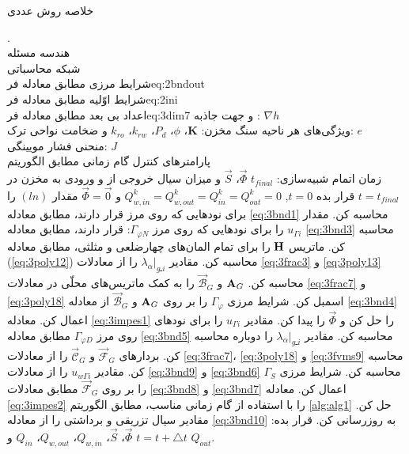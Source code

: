 \begin{algorithm}
	\small    
\caption{خلاصه روش عددی}   
\label{alg:alg2}  
\begin{algorithmic}[1]      
	\REQUIRE .
	\\ هندسه مسئله 
	\\ شبکه محاسباتی 
	\\ شرایط مرزی مطابق معادله ‌فر{eq:2bndout} 
	\\ شرایط اوّلیه مطابق معادله ‌فر{eq:2ini} 
	\\ اعداد بی بعد مطابق معادله ‌فر{eq:3dim7} و جهت جاذبه : $\nabla h$ 
	\\ ویژگی‌های هر ناحیه سنگ مخزن: $\textbf{K}$، $\phi$، $P_d$، $k_{rw}$، $k_{ro}$ و ضخامت نواحی ترک: $e$
	\\ منحنی‌ فشار مویینگی: $J$
	\\ پارامتر‌های کنترل گام زمانی مطابق الگوریتم 
	\\ زمان اتمام شبیه‌سازی: $t_{final}$ 
	\ENSURE $\vec{\Phi}$، $\vec{S}$ و میزان سیال خروجی از و ورودی به مخزن در  $t=t_{final}$
	\STATE قرار بده $t=0$, $Q^k_{w,in}=Q^k_{w,out}=Q^k_{in}=Q^k_{out}=0$ و $\vec{\Phi} = \vec{0}$
	\STATE مقدار  $(ln)$ را برای نودهایی که روی مرز قرار دارند، مطابق معادله \eqref{eq:3bnd1} محاسبه کن.
	\STATE مقدار $u_{\Gamma i}$ را برای نود‌هایی که روی مرز $\Gamma_{\varphi N}$: قرار دارند، مطابق معادله \eqref{eq:3bnd3} محاسبه کن.
	\STATE ماتریس $\textbf H$ را برای تمام المان‌های چهارضلعی و مثلثی، مطابق معادله  (\ref{eq:3poly12}) محاسبه کن.
		\STATE مقادیر $\lambda_\alpha|_{gـi}$ را از معادلات   \eqref{eq:3frac3} و \eqref{eq:3poly13} محاسبه کن.
		\STATE $\textbf A_G$ و $\vec{\mathcal B}_G$ را به کمک ماتریس‌های محلّی در معادلات \eqref{eq:3frac7} و \eqref{eq:3poly18} اسمبل کن.
		\STATE شرایط مرزی $\Gamma_\varphi$ را بر روی $\textbf A_G$ و $\vec{\mathcal B}_G$ از معادله \eqref{eq:3bnd4} اعمال کن. 
		\STATE معادله \eqref{eq:3impes1} را حل کن و  $\vec \Phi$ را پیدا کن.
		\STATE مقادیر $u_{\Gamma i}$ را برای نودهای روی مرز $\Gamma_{\varphi D}$ مطابق معادله \eqref{eq:3bnd5} محاسبه کن.
		\STATE  مقادیر $\lambda_\alpha|_{gـi}$ را دوباره محاسبه کن.
		\STATE بردارهای $\vec{\mathcal F}_G$ و $\vec{\mathcal C}_G$ را از معادلات \eqref{eq:3frac7}، \eqref{eq:3poly18} و \eqref{eq:3fvms9} محاسبه کن.
		\STATE مقادیر $u_{w\Gamma i}$  را از معادلات  \eqref{eq:3bnd9} و \eqref{eq:3bnd6} محاسبه کن.
		\STATE شرایط مرزی $\Gamma_S$ را بر روی $\vec{\mathcal F}_G$ مطابق معادلات \eqref{eq:3bnd8} و \eqref{eq:3bnd7} اعمال کن. 
		\STATE معادله \eqref{eq:3impes2} را با استفاده از گام زمانی مناسب، مطابق الگوریتم \ref{alg:alg1} حل کن.
		\STATE مقادیر سیال تزریقی و برداشتی را از معادله \eqref{eq:3bnd10} به روز‌رسانی کن.
		\STATE قرار بده: $t=t+\triangle t$
	\ENDWHILE	
	\RETURN $\vec{\Phi}$، $\vec{S}$، $Q_{w,in}$، $Q_{w,out}$، $Q_{in}$ و $Q_{out}$. 
\end{algorithmic}    
\end{algorithm}
